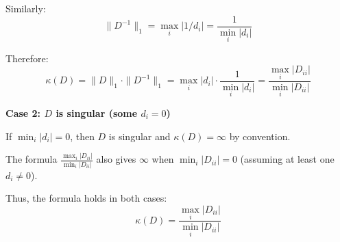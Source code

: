 \documentclass[reqno, answers]{exam}
\begin{document}
\begin{questions}
\begin{solution}
Similarly:
\[
\|D^{-1}\|_1 = \max_i |1/d_i| = \frac{1}{\min_i |d_i|}
\]

Therefore:
\[
\kappa(D) = \|D\|_1 \cdot \|D^{-1}\|_1 = \max_i |d_i| \cdot \frac{1}{\min_i |d_i|} = \frac{\max_i |D_{ii}|}{\min_i |D_{ii}|}
\]

\textbf{Case 2: $D$ is singular (some $d_i = 0$)}

If $\min_i |d_i| = 0$, then $D$ is singular and $\kappa(D) = \infty$ by convention.

The formula $\frac{\max_i |D_{ii}|}{\min_i |D_{ii}|}$ also gives $\infty$ when $\min_i |D_{ii}| = 0$ (assuming at least one $d_i \neq 0$).

Thus, the formula holds in both cases:
\[
\boxed{\kappa(D) = \frac{\max_i |D_{ii}|}{\min_i |D_{ii}|}}
\]
\end{solution}

\end{questions}
\end{document}
